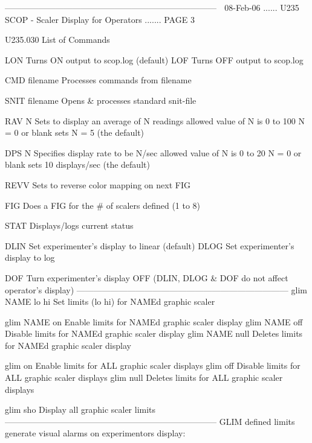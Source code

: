    ---------------------------------------------------------------------------
    
   08-Feb-06 ...... U235  SCOP - Scaler Display for Operators ....... PAGE   3
 
 
 
   U235.030  List of Commands
 
   LON              Turns ON  output to scop.log  (default)
   LOF              Turns OFF output to scop.log
 
   CMD   filename   Processes commands from filename
 
   SNIT  filename   Opens & processes standard snit-file
 
   RAV   N          Sets to display an average of N readings
                    allowed value of N is 0 to 100
                    N = 0 or blank sets N = 5 (the default)
 
   DPS   N          Specifies display rate to be N/sec
                    allowed value of N is 0 to 20
                    N = 0 or blank sets 10 displays/sec (the default)
 
   REVV             Sets to reverse color mapping on next FIG
 
   FIG              Does a FIG for the # of scalers defined (1 to 8)
 
   STAT             Displays/logs current status
 
   DLIN             Set  experimenter's display to linear (default)
   DLOG             Set  experimenter's display to log
 
   DOF              Turn experimenter's display OFF
                    (DLIN, DLOG & DOF do not affect operator's display)
   ---------------------------------------------------------------------------
   glim NAME lo hi  Set limits (lo hi) for NAMEd graphic scaler
 
   glim NAME on     Enable  limits for NAMEd graphic scaler display
   glim NAME off    Disable limits for NAMEd graphic scaler display
   glim NAME null   Deletes limits for NAMEd graphic scaler display
 
   glim on          Enable  limits for ALL   graphic scaler displays
   glim off         Disable limits for ALL   graphic scaler displays
   glim null        Deletes limits for ALL   graphic scaler displays
 
   glim sho         Display all graphic scaler limits
   ---------------------------------------------------------------------------
   GLIM defined limits generate visual alarms on experimentors display:
 
